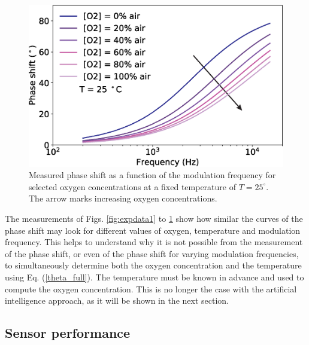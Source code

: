 \documentclass[9pt,twocolumn,twoside,pdftex]{optica}
\begin{document}
\begin{figure}[t!]
\centering
\includegraphics[width=8.2 cm]{phase_f_O2.eps}
\caption{Measured phase shift as a function of the modulation frequency for selected oxygen concentrations at a fixed temperature of $T=25 ^{\circ}$. The arrow marks increasing oxygen concentrations.}
\label{fig:expdata3}
\end{figure}

The measurements of Figs. \ref{fig:expdata1} to \ref{fig:expdata3} show how similar the curves of the phase shift may look for different values of oxygen, temperature and modulation frequency. This helps to understand why it is not possible from the measurement of the phase shift, or even of the phase shift for varying modulation frequencies, to simultaneously determine both the oxygen concentration and the temperature using Eq. (\ref{theta_full}). The temperature must be known in advance and used to compute the oxygen concentration. This is no longer the case with the artificial intelligence approach, as it will be shown in the next section. 


\subsection{Sensor performance}
\end{document}
